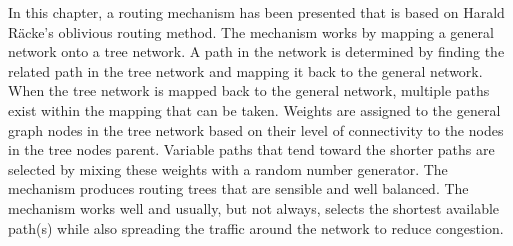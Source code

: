 In this chapter, a routing mechanism has been presented that is based on Harald R\"acke's oblivious routing method. The mechanism works by mapping a general network onto a tree network. A path in the network is determined by finding the related path in the tree network and mapping it back to the general network. When the tree network is mapped back to the general network, multiple paths exist within the mapping that can be taken. Weights are assigned to the general graph nodes in the tree network based on their level of connectivity to the nodes in the tree nodes parent. Variable paths that tend toward the shorter paths are selected by mixing these weights with a random number generator. The mechanism produces routing trees that are sensible and well balanced. The mechanism works well and usually, but not always, selects the shortest available path(s) while also spreading the traffic around the network to reduce congestion. 


